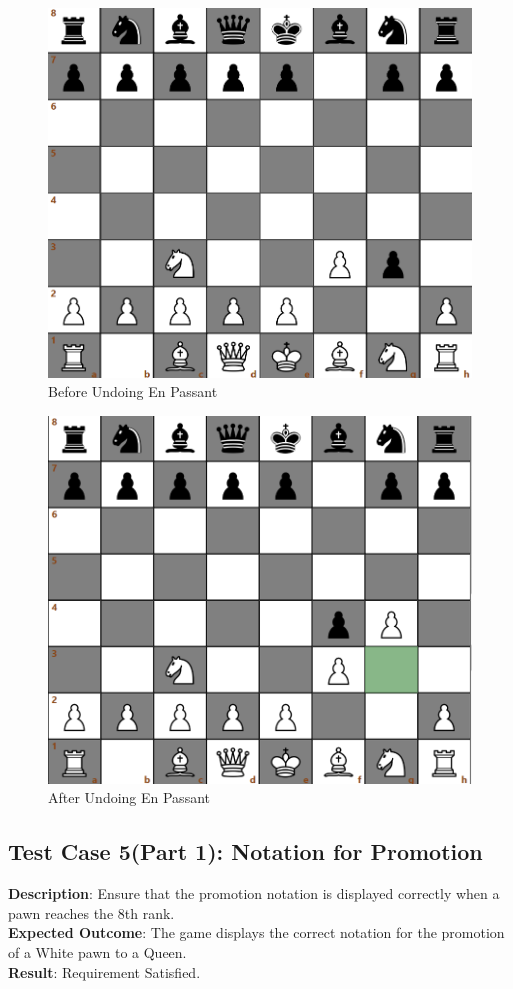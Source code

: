 \documentclass[a4paper,12pt]{article}
\begin{document}
\begin{figure}[H]
    \centering
    \includegraphics[width=0.6\linewidth]{Images/Test Cases/testCase4Img1.png}
    \caption{Before Undoing En Passant}
    \label{fig:BeforeEnPassantUndo}
\end{figure}

\begin{figure}[H]
    \centering
    \includegraphics[width=0.6\linewidth]{Images/Test Cases/testCase4Img2.png}
    \caption{After Undoing En Passant}
    \label{fig:AfterEnPassantUndo}
\end{figure}

\subsection{Test Case 5(Part 1): Notation for Promotion}
\textbf{Description}: Ensure that the promotion notation is displayed correctly when a pawn reaches the 8th rank.\\
\textbf{Expected Outcome}: The game displays the correct notation for the promotion of a White pawn to a Queen.\\
\textbf{Result}: Requirement Satisfied.
\end{document}

